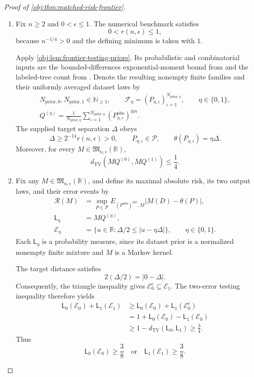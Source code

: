 \documentclass[11pt]{article}
\begin{document}
\begin{proof}[Proof of \cref{obj:thm:matched-risk-frontier}]
\begin{enumerate}
\item Fix \(n\ge2\) and \(0<\epsilon\le1\). The numerical benchmark satisfies
\[
0<r(n,\epsilon)\le1,
\]
because \(n^{-1/4}>0\) and the defining minimum is taken with \(1\).

Apply \cref{obj:lem:frontier-testing-priors}. Its probabilistic and combinatorial inputs are the bounded-differences exponential-moment bound from \citep[Theorem 6.2, displayed log-mgf conclusion in its proof, p.~167]{BoucheronLugosiMassart2013} and the labeled-tree count from \citep[Section 5.6, Theorem 5.40]{KellerTrotterAppliedCombinatorics}. Denote the resulting nonempty finite families and their uniformly averaged dataset laws by
\[
\begin{gathered}
N_{\mathrm{prior},0},N_{\mathrm{prior},1}\in\mathbb N_{\ge1},
\qquad
\mathcal F_\eta
=
(P_{\eta,\iota})_{\iota=1}^{N_{\mathrm{prior},\eta}},
\qquad \eta\in\{0,1\},\\
Q^{(\eta)}
=
\frac{1}{N_{\mathrm{prior},\eta}}
\sum_{\iota=1}^{N_{\mathrm{prior},\eta}}
(P_{\eta,\iota}^{\mathrm{obs}})^{\otimes n}.
\end{gathered}
\]
The supplied target separation \(\Delta\) obeys
\[
\Delta\ge2^{-14}r(n,\epsilon)>0,
\qquad
P_{\eta,\iota}\in\mathcal P,
\qquad
\theta(P_{\eta,\iota})=\eta\Delta.
\]
Moreover, for every \(M\in\mathfrak M_{n,\epsilon}(\mathbb R)\),
\[
d_{\mathrm{TV}}\!\left(MQ^{(0)},MQ^{(1)}\right)\le\frac14.
\]

\item Fix any \(M\in\mathfrak M_{n,\epsilon}(\mathbb R)\), and define its maximal absolute risk, its two output laws, and their error events by
\[
\begin{aligned}
\mathcal R(M)
&=
\sup_{P\in\mathcal P}
E_{(P^{\mathrm{obs}})^{\otimes n},M}
|M(D)-\theta(P)|,\\
\mathsf L_\eta&=MQ^{(\eta)},\\
\mathcal E_\eta
&=
\{u\in\mathbb R:\Delta/2\le |u-\eta\Delta|\},
\qquad \eta\in\{0,1\}.
\end{aligned}
\]
Each \(\mathsf L_\eta\) is a probability measure, since its dataset prior is a normalized nonempty finite mixture and \(M\) is a Markov kernel.

The target distance satisfies
\[
2(\Delta/2)=|0-\Delta|.
\]
Consequently, the triangle inequality gives
\(\mathcal E_0^c\subseteq\mathcal E_1\). The two-error testing inequality therefore yields
\[
\begin{aligned}
\mathsf L_0(\mathcal E_0)+\mathsf L_1(\mathcal E_1)
&\ge
\mathsf L_0(\mathcal E_0)+\mathsf L_1(\mathcal E_0^c)\\
&=
1+\mathsf L_0(\mathcal E_0)-\mathsf L_1(\mathcal E_0)\\
&\ge
1-d_{\mathrm{TV}}(\mathsf L_0,\mathsf L_1)
\ge\frac34.
\end{aligned}
\]
Thus
\[
\mathsf L_0(\mathcal E_0)\ge\frac38
\quad\text{or}\quad
\mathsf L_1(\mathcal E_1)\ge\frac38.
\]


\end{enumerate}
\end{proof}
\end{document}
